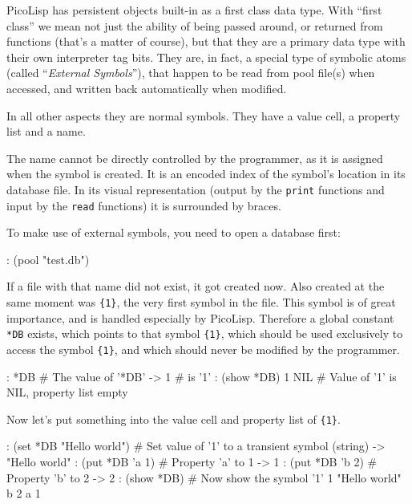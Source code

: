 PicoLisp has persistent objects built-in as a first class data type.
With ``first class'' we mean not just the ability of being passed around,
or returned from functions (that's a matter of course), but that they
are a primary data type with their own interpreter tag bits. They are,
in fact, a special type of symbolic atoms (called
``\emph{External Symbols}''), that happen to be read from
pool file(s) when accessed, and written back automatically when
modified.

In all other aspects they are normal symbols. They have a value cell, a
property list and a name.

The name cannot be directly controlled by the programmer, as it is
assigned when the symbol is created. It is an encoded index of the
symbol's location in its database file. In its visual representation
(output by the \texttt{print} functions and input by the \texttt{read} functions) it
is surrounded by braces.

To make use of external symbols, you need to open a database first:


\begin{wideverbatim}
: (pool "test.db")
\end{wideverbatim}

If a file with that name did not exist, it got created now. Also created
at the same moment was \texttt{\{1\}}, the very first symbol in the file. This
symbol is of great importance, and is handled especially by PicoLisp.
Therefore a global constant \texttt{*DB} exists, which points to that symbol
\texttt{\{1\}}, which should be used exclusively to access the symbol \texttt{\{1\}}, and
which should never be modified by the programmer.


\begin{wideverbatim}
: *DB                   # The value of '*DB'
-> {1}                  # is '{1}'
: (show *DB)
{1} NIL                 # Value of '{1}' is NIL, property list empty
\end{wideverbatim}

Now let's put something into the value cell and property list of \texttt{\{1\}}.


\begin{wideverbatim}
: (set *DB "Hello world")  # Set value of '{1}' to a transient symbol (string)
-> "Hello world"
: (put *DB 'a 1)           # Property 'a' to 1
-> 1
: (put *DB 'b 2)           # Property 'b' to 2
-> 2
: (show *DB)               # Now show the symbol '{1}'
{1} "Hello world"
   b 2
   a 1
\end{wideverbatim}


